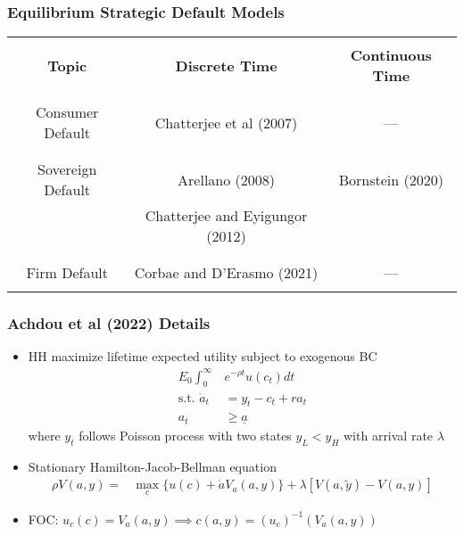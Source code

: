 \documentclass[usenames,dvipsnames, handout, aspectratio=169]{beamer}
\begin{document}
\begin{frame}[label = equilibirum_default_models]
\frametitle{Equilibrium Strategic Default Models}
\small
\begin{center}
\begin{tabular}{ |c|c|c| } 
 \hline
 &&\\
 \textbf{Topic}    & \textbf{Discrete Time}     & \textbf{Continuous Time} \\ 
 &&\\
 \hline
 &&\\
 Consumer Default  & Chatterjee et al (2007)    & --- \\ 
 &&\\
 \hline
 &&\\
 Sovereign Default & Arellano (2008)            & Bornstein (2020) \\
  & Chatterjee and Eyigungor (2012)            &  \\
 &&\\ 
 \hline
 &&\\
 Firm Default      & Corbae and D'Erasmo (2021) & --- \\ 
 &&\\
 \hline
\end{tabular}
\end{center}
\hyperlink{motivation}{}
\end{frame}






\begin{frame}[label = achdou_details_1]
\frametitle{Achdou et al (2022) Details}
\small
\begin{itemize}
\item HH maximize lifetime expected utility subject to exogenous BC
\begin{align*}
E_0 \int_0^\infty & e^{-\rho t} u(c_t) dt \\
\text{s.t. } \dot a_t &= y_t  - c_t + r a_t\\
a_t &\ge \underline a
\end{align*}
where $y_t$ follows Poisson process with two states $y_L<y_H$ with arrival rate $\lambda$
\item Stationary Hamilton-Jacob-Bellman equation
\begin{align*}
\rho V(a, y) =& \max_c \{u(c) + \dot a V_a(a, y) \} + \lambda [V(a, \tilde y) - V(a, y)]
\end{align*}
\item FOC: $u_c(c) =V_a(a, y) \implies c(a, y) = (u_c)^{-1}(V_a(a, y))$
\end{itemize}
\hyperlink{achdou_summary}{}
\end{frame}
\end{document}
